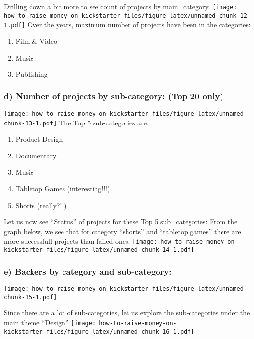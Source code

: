 \documentclass[]{article}
\providecommand{\tightlist}{%
  \setlength{\itemsep}{0pt}\setlength{\parskip}{0pt}}
\begin{document}
Drilling down a bit more to see count of projects by main\_category.
\texttt{[image: how-to-raise-money-on-kickstarter\_files/figure-latex/unnamed-chunk-12-1.pdf]}
Over the years, maximum number of projects have been in the categories:

\begin{enumerate}
\def\labelenumi{\arabic{enumi}.}
\tightlist
\item
  Film \& Video
\item
  Music
\item
  Publishing
\end{enumerate}

\subsubsection{d) Number of projects by sub-category: (Top 20
only)}\label{d-number-of-projects-by-sub-category-top-20-only}

\texttt{[image: how-to-raise-money-on-kickstarter\_files/figure-latex/unnamed-chunk-13-1.pdf]}
The Top 5 sub-categories are:

\begin{enumerate}
\def\labelenumi{\arabic{enumi}.}
\tightlist
\item
  Product Design
\item
  Documentary
\item
  Music
\item
  Tabletop Games (interesting!!!)
\item
  Shorts (really?! )
\end{enumerate}

 Let us now see ``Status'' of projects for these Top 5 sub\_categories:
From the graph below, we see that for category ``shorts'' and ``tabletop
games'' there are more successfull projects than failed ones.
\texttt{[image: how-to-raise-money-on-kickstarter\_files/figure-latex/unnamed-chunk-14-1.pdf]}

\subsubsection{e) Backers by category and
sub-category:}\label{e-backers-by-category-and-sub-category}

\texttt{[image: how-to-raise-money-on-kickstarter\_files/figure-latex/unnamed-chunk-15-1.pdf]}

 Since there are a lot of sub-categories, let us explore the
sub-categories under the main theme ``Design''
\texttt{[image: how-to-raise-money-on-kickstarter\_files/figure-latex/unnamed-chunk-16-1.pdf]}
\end{document}
